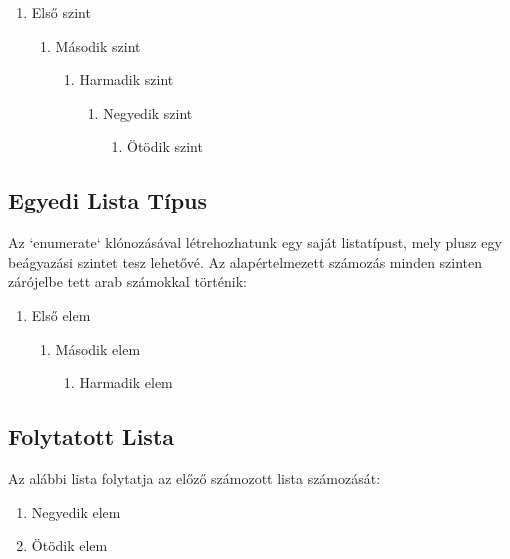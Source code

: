\documentclass[12pt]{article}
\begin{document}
\begin{enumerate}
  \item Első szint
  \begin{enumerate}
    \item Második szint
    \begin{enumerate}
      \item Harmadik szint
      \begin{enumerate}
        \item Negyedik szint
        \begin{enumerate}
          \item Ötödik szint
        \end{enumerate}
      \end{enumerate}
    \end{enumerate}
  \end{enumerate}
\end{enumerate}

\subsection{Egyedi Lista Típus}
Az `enumerate` klónozásával létrehozhatunk egy saját listatípust, mely plusz egy beágyazási szintet tesz lehetővé. Az alapértelmezett számozás minden szinten zárójelbe tett arab számokkal történik:

\begin{enumerate}[label=(\arabic*)]
  \item Első elem
  \begin{enumerate}[label=(\arabic*)]
    \item Második elem
    \begin{enumerate}[label=(\arabic*)]
      \item Harmadik elem
    \end{enumerate}
  \end{enumerate}
\end{enumerate}

\subsection{Folytatott Lista}
Az alábbi lista folytatja az előző számozott lista számozását:

\begin{enumerate}[start=4]
  \item Negyedik elem
  \item Ötödik elem
\end{enumerate}
\end{document}
